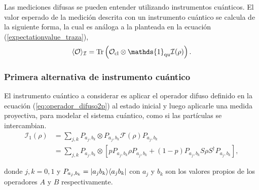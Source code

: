 Las mediciones difusas se pueden entender utilizando instrumentos cuánticos. El valor esperado de la medición descrita con un instrumento cuántico se calcula de la siguiente forma, la cual es análoga a la planteada en la ecuación ({\ref{expectationvalue_traza}}), \begin{equation}\label{valueExpectedQuantumInstrument}
\langle \mathcal{O}\rangle_{\mathcal{I}}= \tr\left(\mathcal{O}_{\text{cl}}\otimes \mathds{1}_{\text{qu}}\mathcal{I}(\rho)\right).
\end{equation}%






\subsubsection{Primera alternativa de instrumento cuántico} %
El instrumento cuántico a considerar es aplicar el operador difuso definido en la ecuación ({\ref{eq:operador_difuso2p}}) al estado inicial y luego aplicarle una medida proyectiva, para modelar el sistema cuántico, como  si las partículas se intercambian.\begin{equation}\label{fisrtinstrument}
    \begin{split}
        \mathcal{I}_1(\rho)&=\sum_{j,k}P_{a_j,b_k}\otimes P_{a_j,b_k} \mathcal{F}(\rho) P_{a_j,b_k}\\
        &=\sum_{j,k}P_{a_j,b_k}\otimes[p P_{a_j,b_k}\rho P_{a_j,b_k}+(1-p)P_{a_j,b_k}S\rho S^\dagger P_{a_j,b_k}],
\end{split}
\end{equation}

donde $j,k=0,1$ y $P_{a_j,b_k}=|a_j b_k\rangle \langle a_j b_k|$ con $a_j$ y $b_k$ son los valores propios de los operadores $A$ y $B$ respectivamente.

